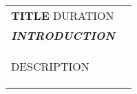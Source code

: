 \begin{tabularx}{\linewidth}{ @{}l r@{} }
\textbf{{{TITLE}}} \hfill  {{DURATION}}  \\[2pt]
\textbf{\textit{{{INTRODUCTION}}}} \hfill\\[2pt]
\begin{minipage}[t]{\linewidth}
    \begin{itemize}[nosep,after=\strut, leftmargin=2em, itemsep=2pt]
        {{DESCRIPTION}}  
    \end{itemize}
    \end{minipage}
\end{tabularx}